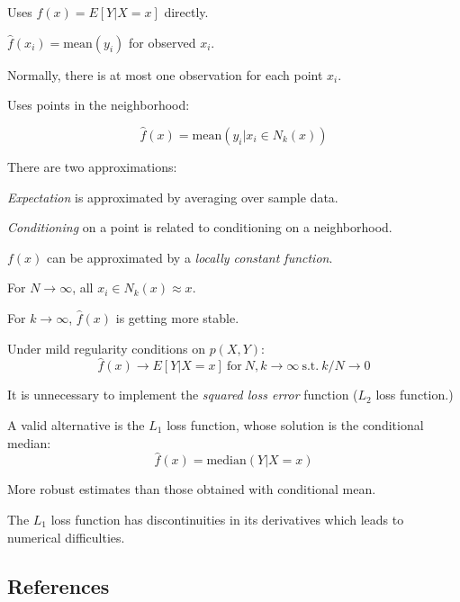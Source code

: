 \documentclass[twoside,twocolumn,10pt]{revtex4-1}
\newcommand{\SubItem}[1]{
    {\setlength\itemindent{15pt} \item[-] #1}
}
\begin{document}
	\begin{itemize}
	\item Uses $f(x) = E[Y|X = x]$ directly.
	\item $\hat{f}(x_i) = \text{mean}(y_i)$ for observed $x_i$.
	\item Normally, there is at most one observation for each point $x_i$.
	\item Uses points in the neighborhood:
	
		\begin{equation*}
		\hat{f}(x) = \text{mean}(y_i | x_i \in N_k(x))
		\end{equation*}

	\item There are two approximations:
	\SubItem{\textit{Expectation} is approximated by averaging over sample data.}
	\SubItem{\textit{Conditioning} on a point is related to conditioning on a neighborhood.}
	\item $f(x)$ can be approximated by a \textit{locally constant function}.
	\item For $N \to \infty$, all $x_i \in N_k(x) \approx x$.
	\item For $k \to \infty$, $\hat{f}(x)$ is getting more stable.
	\item Under mild regularity conditions on $p(X,Y)$:
		\begin{equation*}
		\hat{f}(x) \to E[Y|X = x] \ \text{for} \ N, k \to \infty \ \text{s.t.} \ k/N \to 0
		\end{equation*}		
	\item It is unnecessary to implement the \textit{squared loss error} function ($L_2$ loss function.)
	\item A valid alternative is the $L_1$ loss function, whose solution is the conditional median:
		\begin{equation}
		\hat{f}(x) = \text{median}(Y|X=x)
		\end{equation}
	\item More robust estimates than those obtained with conditional mean.
	\item The $L_1$ loss function has discontinuities in its derivatives which leads to numerical difficulties.
	\end{itemize}
		
	
	\subsection*{References}
	
	
	
	


	
\end{document}
